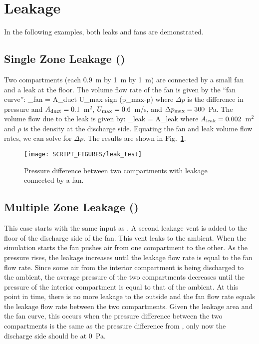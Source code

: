 \documentclass[11pt]{book}
\begin{document}
\section{Leakage}

In the following examples, both leaks and fans are demonstrated.

\subsection{Single Zone Leakage (\texorpdfstring{}{leak\_test})}
\label{single_zone_leak}
\label{leak_test}

Two compartments (each 0.9~m by 1~m by 1~m) are connected by a small fan and a leak at the floor. The volume flow rate of the fan is given by the ``fan curve'':
\be
  _{\hbox{\footnotesize fan}} = A_{\hbox{\footnotesize duct}}
  U_{\hbox{\footnotesize max}} \;
   \hbox{sign} (\Delta p_{\hbox{\footnotesize max}}-\Delta p)
\ee
where $\Delta p$ is the difference in pressure and $A_{\hbox{\scriptsize duct}}=0.1$~m$^2$, $U_{\hbox{\scriptsize max}}=0.6$~m/s, and $\Delta p_{\hbox{\scriptsize max}}=300$~Pa. The volume flow due to the leak is given by:
\be
   _{\hbox{\scriptsize leak}} = A_{\hbox{\scriptsize leak}} 
\ee
where $A_{\hbox{\scriptsize leak}}=0.002$~m$^2$ and $\rho$ is the density at the discharge side. Equating the fan and leak volume flow rates, we can solve for $\Delta p$. The results are shown in Fig.~\ref{leak_test_fig}.

\begin{figure}[ht]
\centering
\texttt{[image: SCRIPT\_FIGURES/leak\_test]}
\caption[The  case]{Pressure difference between two compartments with leakage connected by a fan.}
\label{leak_test_fig}
\end{figure}

\subsection{Multiple Zone Leakage (\texorpdfstring{}{leak\_test\_2})}
\label{leak_test_2}

This case starts with the same input as .  A second leakage vent is added to the floor of the discharge side of the fan.  This vent leaks to the ambient.  When the simulation starts the fan pushes air from one compartment to the other. As the pressure rises, the leakage increases until the leakage flow rate is equal to the fan flow rate. Since some air from the interior compartment is being discharged to the ambient, the average pressure of the two compartments decreases until the pressure of the interior compartment is equal to that of the ambient. At this point in time, there is no more leakage to the outside and the fan flow rate equals the leakage flow rate between the two compartments.  Given the leakage area and the fan curve, this occurs when the pressure difference between the two compartments is the same as the pressure difference from , only now the discharge side should be at 0~Pa.
\end{document}
